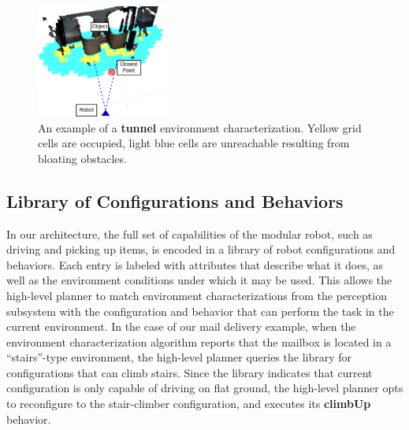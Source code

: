 \documentclass[journal]{IEEEtran}
\begin{document}
%
\begin{figure}
\begin{center}
\includegraphics[width=0.4\textwidth]{images/characterization.png}
\caption{An example of a \textbf{tunnel} environment characterization. Yellow grid cells are occupied, light blue cells are unreachable resulting from bloating obstacles.}
\label{fig:characterization}
\end{center}
\vspace{-2em}
\end{figure}

\subsection{Library of Configurations and Behaviors}
\label{sec:configuration-specifics}
%
In our architecture, the full set of capabilities of the modular robot, such as driving and picking up items, is encoded in a library of robot configurations and behaviors.  Each entry is labeled with  attributes that describe what it does, as well as the environment conditions under which it may be used. This allows the high-level planner to match environment characterizations from the perception subsystem with the configuration and behavior that can perform the task in the current environment. In the case of our mail delivery example, when the environment characterization algorithm reports that the mailbox is located in a ``stairs''-type environment, the high-level planner queries the library for configurations that can climb stairs.  Since the library indicates that current configuration is only capable of driving on flat ground, the high-level planner opts to reconfigure to the stair-climber configuration, and executes its \textbf{climbUp} behavior.
\end{document}
